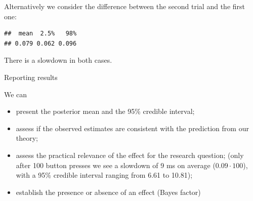 \documentclass[12pt,ignorenonframetext,aspectratio=169]{beamer}
\newenvironment{Shaded}{\begin{snugshade}}{\end{snugshade}}
\newcommand{\CommentTok}[1]{\textcolor[rgb]{0.56,0.35,0.01}{\textit{#1}}}
\newcommand{\DataTypeTok}[1]{\textcolor[rgb]{0.13,0.29,0.53}{#1}}
\newcommand{\DecValTok}[1]{\textcolor[rgb]{0.00,0.00,0.81}{#1}}
\newcommand{\FloatTok}[1]{\textcolor[rgb]{0.00,0.00,0.81}{#1}}
\newcommand{\KeywordTok}[1]{\textcolor[rgb]{0.13,0.29,0.53}{\textbf{#1}}}
\newcommand{\NormalTok}[1]{#1}
\newcommand{\OperatorTok}[1]{\textcolor[rgb]{0.81,0.36,0.00}{\textbf{#1}}}
\newcommand{\StringTok}[1]{\textcolor[rgb]{0.31,0.60,0.02}{#1}}
\providecommand{\tightlist}{%
  \setlength{\itemsep}{0pt}\setlength{\parskip}{0pt}}
\begin{document}
\begin{frame}[fragile]

Alternatively we consider the difference between the second trial and the first one:

\scriptsize

\begin{Shaded}
\end{Shaded}

\begin{verbatim}
##  mean  2.5%   98% 
## 0.079 0.062 0.096
\end{verbatim}

\normalsize

There is a slowdown in both cases.

\end{frame}

\begin{frame}{Reporting results}
\protect\hypertarget{reporting-results}{}

\begin{block}{We can}

\begin{itemize}
\tightlist
\item
  present the posterior mean and the 95\% credible interval;
\item
  assess if the observed estimates are consistent with the prediction from our theory;
\item
  assess the practical relevance of the effect for the research question; (only after 100 button presses we see a slowdown of 9 ms on average (\(0.09 \cdot 100\)), with a 95\% credible interval ranging from 6.61 to 10.81);
\item
  establish the presence or absence of an effect (Bayes factor)
\end{itemize}

\end{block}

\end{frame}
\end{document}
